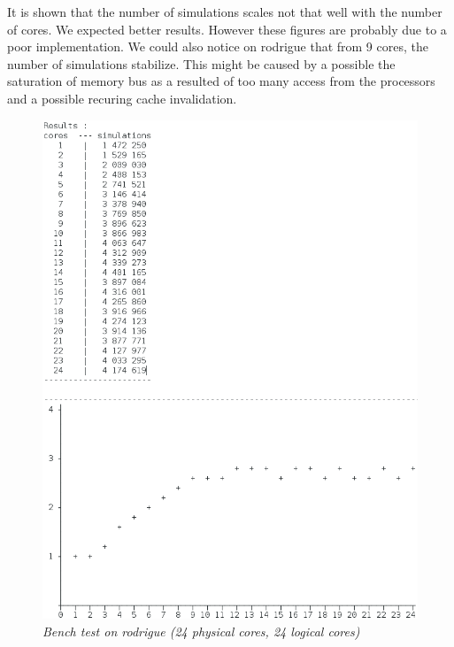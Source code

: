 It is shown that the number of simulations scales not that well with the number of cores. We expected better results. However these figures are probably due to a poor implementation.
We could also notice on rodrigue that from 9 cores, the number of simulations stabilize. This might be caused by a possible the saturation of memory bus as a resulted of too many access from the processors and a possible recuring cache invalidation.

\begin{figure}[H] 
\centerline{\includegraphics[width=\textwidth]{Optimisations/bench_rodrigue.png}}
\caption{\label{fig:Defrag}\textit{Bench test on rodrigue (24 physical cores, 24 logical cores)}}
\end{figure}



